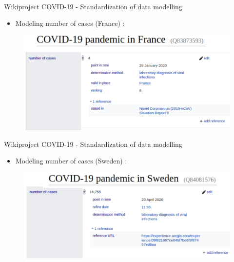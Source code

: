 \documentclass{beamer}
\begin{document}


\begin{frame}{Wikiproject COVID-19 - Standardization of data modelling}

\begin{itemize}
    \item Modeling number of cases (France) :
\end{itemize}

\begin{figure}
\includegraphics[scale=0.65]{fig/france_case_model.png}
\end{figure}

\end{frame}


\begin{frame}{Wikiproject COVID-19 - Standardization of data modelling}

\begin{itemize}
    \item Modeling number of cases (Sweden) :
\end{itemize}

\begin{figure}
\includegraphics[scale=0.65]{fig/sweden_case_model.png}
\end{figure}

\end{frame}
\end{document}
